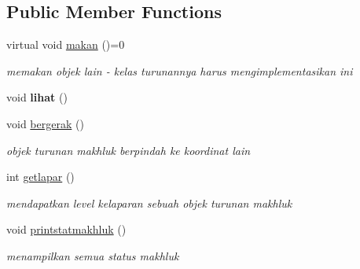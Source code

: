 \subsection*{Public Member Functions}
\begin{DoxyCompactItemize}
\item 
virtual void \hyperlink{classkarnivora_a80ebba77a163a8412be6f05ac0000a6b}{makan} ()=0\hypertarget{classkarnivora_a80ebba77a163a8412be6f05ac0000a6b}{}\label{classkarnivora_a80ebba77a163a8412be6f05ac0000a6b}

\begin{DoxyCompactList}\small\item\em memakan objek lain -\/ kelas turunannya harus mengimplementasikan ini \end{DoxyCompactList}\item 
void {\bfseries lihat} ()\hypertarget{classkarnivora_a14a6b8728c4c8e0310cf4ccbff9b5d63}{}\label{classkarnivora_a14a6b8728c4c8e0310cf4ccbff9b5d63}

\item 
void \hyperlink{classkarnivora_a9ba6d3ddb24b0266aa40d8a2555cd11c}{bergerak} ()\hypertarget{classkarnivora_a9ba6d3ddb24b0266aa40d8a2555cd11c}{}\label{classkarnivora_a9ba6d3ddb24b0266aa40d8a2555cd11c}

\begin{DoxyCompactList}\small\item\em objek turunan makhluk berpindah ke koordinat lain \end{DoxyCompactList}\item 
int \hyperlink{classkarnivora_a33ff754594ab65d83eaf6dd7bb30d8a5}{getlapar} ()\hypertarget{classkarnivora_a33ff754594ab65d83eaf6dd7bb30d8a5}{}\label{classkarnivora_a33ff754594ab65d83eaf6dd7bb30d8a5}

\begin{DoxyCompactList}\small\item\em mendapatkan level kelaparan sebuah objek turunan makhluk \end{DoxyCompactList}\item 
void \hyperlink{classkarnivora_aefc7c8260e5f282f63f5eff0c08e266c}{printstatmakhluk} ()\hypertarget{classkarnivora_aefc7c8260e5f282f63f5eff0c08e266c}{}\label{classkarnivora_aefc7c8260e5f282f63f5eff0c08e266c}

\begin{DoxyCompactList}\small\item\em menampilkan semua status makhluk \end{DoxyCompactList}\end{DoxyCompactItemize}

